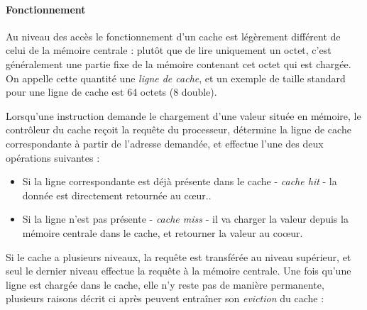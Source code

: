 \paragraph{Fonctionnement}

Au niveau des accès le fonctionnement d'un cache est légèrement différent de celui de la mémoire centrale : plutôt que de lire uniquement un octet, c'est généralement une partie fixe de la mémoire contenant cet octet qui est chargée.
On appelle cette quantité une \emph{ligne de cache}, et un exemple de taille standard pour une ligne de cache est 64 octets (8 double).

Lorsqu'une instruction demande le chargement d'une valeur située en mémoire, le contrôleur du cache reçoit la requête du processeur, détermine la ligne de cache correspondante à partir de l'adresse demandée, et effectue l'une des deux opérations suivantes :
\begin{itemize}
    \item Si la ligne correspondante est déjà présente dans le cache - \emph{cache hit} - la donnée est directement retournée au cœur..
    \item Si la ligne n'est pas présente - \emph{cache miss} - il va charger la valeur depuis la mémoire centrale dans le cache, et retourner la valeur au coœur.
\end{itemize}

Si le cache a plusieurs niveaux, la requête est transférée au niveau supérieur, et seul le dernier niveau effectue la requête à la mémoire centrale.
Une fois qu'une ligne est chargée dans le cache, elle n'y reste pas de manière permanente, plusieurs raisons décrit ci après peuvent entraîner son \emph{eviction} du cache :

